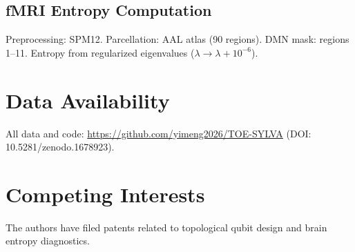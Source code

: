 \documentclass[11pt]{article}
\begin{document}
\subsection{fMRI Entropy Computation}
Preprocessing: SPM12. Parcellation: AAL atlas (90 regions). DMN mask: regions 1--11. Entropy from regularized eigenvalues ($\lambda \to \lambda + 10^{-6}$).

\section*{Data Availability}
All data and code: \url{https://github.com/yimeng2026/TOE-SYLVA} (DOI: 10.5281/zenodo.1678923).

\section*{Competing Interests}
The authors have filed patents related to topological qubit design and brain entropy diagnostics.



\end{document}
